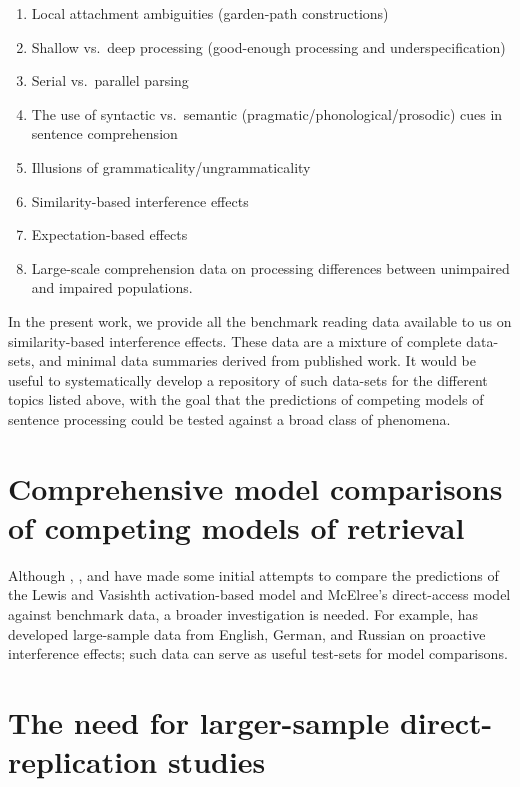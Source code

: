 \documentclass{cambridge7A}\usepackage[]{graphicx}\usepackage[]{color}
\begin{document}
\begin{enumerate}
\item Local attachment ambiguities (garden-path constructions)
\item Shallow vs.\ deep processing (good-enough processing and underspecification)
\item Serial vs.\ parallel parsing
\item The use of syntactic vs.\ semantic (pragmatic/phonological/prosodic) cues in sentence comprehension
\item Illusions of grammaticality/ungrammaticality
\item Similarity-based interference effects
\item Expectation-based effects
\item Large-scale comprehension data on processing differences between unimpaired and impaired populations.
\end{enumerate}

In the present work, we provide  all the benchmark reading data available to us on similarity-based interference effects. These data are a mixture of complete data-sets, and minimal data summaries derived from published work. It would be useful to systematically develop a repository of such data-sets for the different topics listed above, with the goal that the predictions of competing models of sentence processing could be tested against a broad class of phenomena.

\section{Comprehensive model comparisons of competing models of retrieval}

Although \cite{NicenboimRetrieval2018}, \cite{VasishthChopinRyderNicenboimCogSci2017}, and \cite{LissonEtAl2020} have made some initial attempts to compare the predictions of the Lewis and Vasishth activation-based model and McElree's direct-access model against benchmark data, a broader investigation is needed. For example, \cite{MertzenEtAlAMLaP2019} has developed large-sample data from English, German, and Russian on proactive interference effects; such data can serve as useful test-sets for model comparisons.

\section{The need for larger-sample direct-replication studies}
\end{document}

